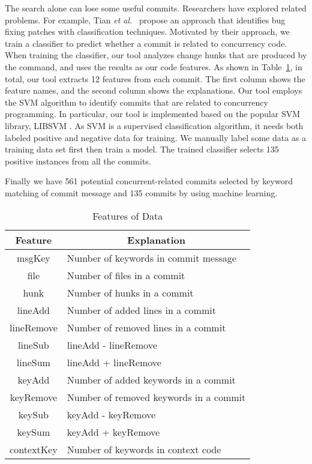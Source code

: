 The search alone can lose some useful commits. Researchers have explored related problems. For example, Tian \emph{et al.}~\cite{tian2012identifying} propose an approach that identifies bug fixing patches with classification techniques. Motivated by their approach, we train a classifier to predict whether a commit is related to concurrency code. When training the classifier, our tool analyzes change hunks that are produced by the  command, and uses the results as our code features. As shown in Table~\ref{table:feature}, in total, our tool extracts 12 features from each commit. The first column shows the feature names, and the second column shows the explanations.
Our tool employs the SVM \cite{journals/ml/CortesV95} algorithm to identify commits that are related to concurrency programming. In particular, our tool is implemented based on the popular SVM library, LIBSVM \cite{libsvm}. As SVM is a supervised classification algorithm, it needs both labeled positive and negative data for training. We manually label some data as a training data set first then train a model. The trained classifier selects 135 positive instances from all the commits.


Finally we have 561 potential concurrent-related commits selected by keyword matching of commit message and 135 commits by using machine learning.

\begin{table}
	\centering
	\caption{Features of Data}
	\label{table:feature}
	\begin{tabular}{|c|l|}\hline
		Feature&\multicolumn{1}{|c|}{Explanation}\\\hline
		msgKey&Number of keywords in commit message\\
		file&Number of files in a commit\\
		hunk&Number of hunks in a commit\\
		lineAdd&Number of added lines in a commit\\
		lineRemove&Number of removed lines in a commit\\
		lineSub&lineAdd - lineRemove\\
		lineSum&lineAdd + lineRemove\\
		keyAdd&Number of added keywords in a commit\\
		keyRemove&Number of removed keywords in a commit\\
		keySub&keyAdd - keyRemove\\
		keySum&keyAdd + keyRemove\\
		contextKey&Number of keywords in context code\\\hline
	\end{tabular}
\end{table}

